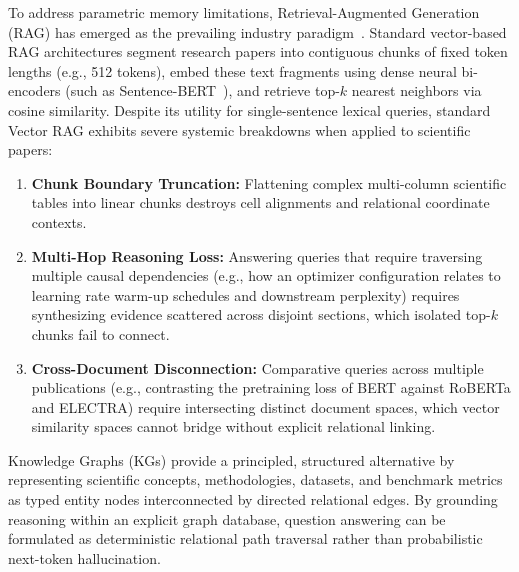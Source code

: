 To address parametric memory limitations, Retrieval-Augmented Generation (RAG) has emerged as the prevailing industry paradigm~\cite{lewis2020retrieval}. Standard vector-based RAG architectures segment research papers into contiguous chunks of fixed token lengths (e.g., 512 tokens), embed these text fragments using dense neural bi-encoders (such as Sentence-BERT~\cite{reimers2019sentence}), and retrieve top-$k$ nearest neighbors via cosine similarity. Despite its utility for single-sentence lexical queries, standard Vector RAG exhibits severe systemic breakdowns when applied to scientific papers:
\begin{enumerate}
    \item \textbf{Chunk Boundary Truncation:} Flattening complex multi-column scientific tables into linear chunks destroys cell alignments and relational coordinate contexts.
    \item \textbf{Multi-Hop Reasoning Loss:} Answering queries that require traversing multiple causal dependencies (e.g., how an optimizer configuration relates to learning rate warm-up schedules and downstream perplexity) requires synthesizing evidence scattered across disjoint sections, which isolated top-$k$ chunks fail to connect.
    \item \textbf{Cross-Document Disconnection:} Comparative queries across multiple publications (e.g., contrasting the pretraining loss of BERT against RoBERTa and ELECTRA) require intersecting distinct document spaces, which vector similarity spaces cannot bridge without explicit relational linking.
\end{enumerate}

Knowledge Graphs (KGs) provide a principled, structured alternative by representing scientific concepts, methodologies, datasets, and benchmark metrics as typed entity nodes interconnected by directed relational edges. By grounding reasoning within an explicit graph database, question answering can be formulated as deterministic relational path traversal rather than probabilistic next-token hallucination.

